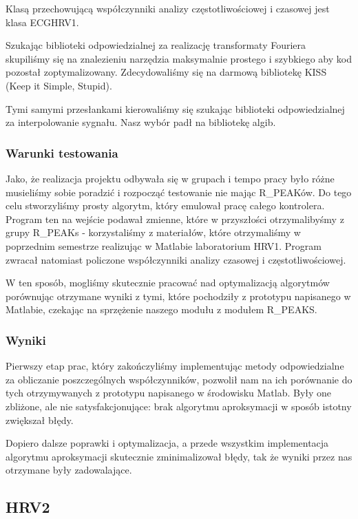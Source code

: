 \documentclass[a4paper, 11pt]{article}
\begin{document}
Klasą przechowującą współczynniki analizy częstotliwościowej i czasowej jest klasa ECGHRV1.

Szukając biblioteki odpowiedzialnej za realizację transformaty Fouriera skupiliśmy się na znalezieniu narzędzia maksymalnie prostego i szybkiego aby kod pozostał zoptymalizowany. Zdecydowaliśmy się na darmową bibliotekę KISS (Keep it Simple, Stupid).

Tymi samymi przesłankami kierowaliśmy się szukając biblioteki odpowiedzialnej za interpolowanie sygnału. Nasz wybór padł na bibliotekę algib.

\subsubsection{Warunki testowania}
\label{sec:hrv1:tests}

Jako, że realizacja projektu odbywała się w grupach i tempo pracy było różne musieliśmy sobie poradzić i rozpocząć testowanie nie mając R\_PEAKów. Do tego celu stworzyliśmy prosty algorytm, który emulował pracę całego kontrolera. Program ten na wejście podawał zmienne, które w przyszłości otrzymalibyśmy z grupy R\_PEAKs - korzystaliśmy z materiałów, które otrzymaliśmy w poprzednim semestrze realizując w Matlabie laboratorium HRV1. Program zwracał natomiast policzone współczynniki analizy czasowej i częstotliwościowej.

W ten sposób, mogliśmy skutecznie pracować nad optymalizacją algorytmów porównując otrzymane wyniki z tymi, które pochodziły z prototypu napisanego w Matlabie, czekając na sprzężenie naszego modułu z modułem R\_PEAKS.

\subsubsection{Wyniki}
\label{sec:hrv1:results}
Pierwszy etap prac, który zakończyliśmy implementując metody odpowiedzialne za obliczanie poszczególnych współczynników, pozwolił nam na ich porównanie do tych otrzymywanych z prototypu napisanego w środowisku Matlab. Były one zbliżone, ale nie satysfakcjonujące: brak algorytmu aproksymacji w sposób istotny zwiększał błędy.

Dopiero dalsze poprawki i optymalizacja, a przede wszystkim implementacja algorytmu aproksymacji skutecznie zminimalizował błędy, tak że wyniki przez nas otrzymane były zadowalające.


\subsection{HRV2}
\label{sec:hrv2}
\end{document}
